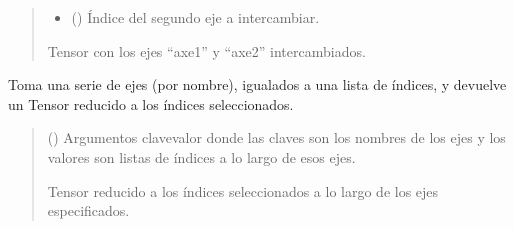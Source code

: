 \documentclass[letterpaper,10pt,english]{sphinxmanual}
\begin{document}
\begin{fulllineitems}
\begin{fulllineitems}
\begin{quote}
\begin{description}
\begin{itemize}
\item {} 
\sphinxAtStartPar
{} () \textendash{} Índice del segundo eje a intercambiar.

\end{itemize}

\sphinxAtStartPar
Tensor con los ejes “axe1” y “axe2” intercambiados.

\sphinxAtStartPar
{\hyperref[\detokenize{myutils:myutils.tensor.Tensor}]{}}

\end{description}\end{quote}

\end{fulllineitems}


\begin{fulllineitems}
\label{\detokenize{myutils:myutils.tensor.Tensor.take}}
\pysigstartsignatures
{}
\pysigstopsignatures
\sphinxAtStartPar
Toma una serie de ejes (por nombre), igualados a una lista de índices, y devuelve un Tensor
reducido a los índices seleccionados.
\begin{quote}\begin{description}
\sphinxAtStartPar
{} () \textendash{} Argumentos clave\sphinxhyphen{}valor donde las claves son los nombres de los ejes y los valores
son listas de índices a lo largo de esos ejes.

\sphinxAtStartPar
Tensor reducido a los índices seleccionados a lo largo de los ejes especificados.

\sphinxAtStartPar
{\hyperref[\detokenize{myutils:myutils.tensor.Tensor}]{}}

\end{description}\end{quote}

\end{fulllineitems}


\end{fulllineitems}
\end{document}
